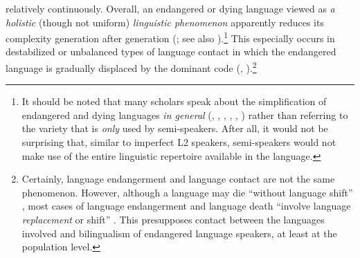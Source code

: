 \documentclass[output=paper,hidelinks]{langscibook}
\begin{document}
relatively continuously. Overall, an endangered or dying language viewed as \textit{a holistic} (though not uniform) \textit{linguistic phenomenon} apparently reduces its complexity generation after generation (\citealt[203]{austin_structural_1986}; see also \citealt{dorian_fate_1978, dorian_language_1980, swiggers_two_2007, sallabank_diversity_2012, sallabank_attitudes_2013, palosaari_structural_2011, filipovic_introduction_2016}).\footnote{It should be noted that many scholars speak about the simplification of endangered and dying languages \textit{in general} (\citealt[85]{dorian_language_1980}, \citealt[203]{austin_structural_1986}, \citealt[24]{swiggers_two_2007}, \citealt[256]{mesthrie_introducing_2009}, \citealt[110, 112]{palosaari_structural_2011}, \citealt[118]{sallabank_attitudes_2013}) rather than referring to the variety that is \textit{only} used by semi-speakers. After all, it would not be surprising that, similar to imperfect L2 speakers, semi-speakers would not make use of the entire linguistic repertoire available in the language.} This especially occurs in destabilized or unbalanced types of language contact in which the endangered language is gradually displaced by the dominant code (\citealt[47]{aikhenvald_grammars_2007}, \citealt{meakins_birth_2019}).\footnote{Certainly, language endangerment and language contact are not the same phenomenon. However, although a language may die “without language shift” \citep[201]{austin_structural_1986}, most cases of language endangerment and language death “involve language \textit{replacement} or shift” \citep[201]{austin_structural_1986}. This presupposes contact between the languages involved and bilingualism of endangered language speakers, at least at the population level.}
\end{document}
